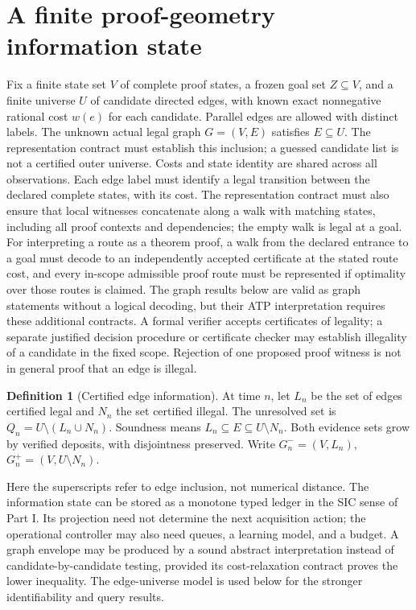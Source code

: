 \documentclass[11pt]{article}
\theoremstyle{definition}\newtheorem{definition}[theorem]{Definition}\newtheorem{example}[theorem]{Example}\newtheorem{conjecture}[theorem]{Conjecture}
\begin{document}
\section{A finite proof-geometry information state}
Fix a finite state set $V$ of complete proof states, a frozen goal set $Z\subseteq V$, and a finite universe $U$ of candidate directed edges, with known exact nonnegative rational cost $w(e)$ for each candidate. Parallel edges are allowed with distinct labels. The unknown actual legal graph $G=(V,E)$ satisfies $E\subseteq U$. The representation contract must establish this inclusion; a guessed candidate list is not a certified outer universe. Costs and state identity are shared across all observations. Each edge label must identify a legal transition between the declared complete states, with its cost. The representation contract must also ensure that local witnesses concatenate along a walk with matching states, including all proof contexts and dependencies; the empty walk is legal at a goal. For interpreting a route as a theorem proof, a walk from the declared entrance to a goal must decode to an independently accepted certificate at the stated route cost, and every in-scope admissible proof route must be represented if optimality over those routes is claimed. The graph results below are valid as graph statements without a logical decoding, but their ATP interpretation requires these additional contracts. A formal verifier accepts certificates of legality; a separate justified decision procedure or certificate checker may establish illegality of a candidate in the fixed scope. Rejection of one proposed proof witness is not in general proof that an edge is illegal.
\begin{definition}[Certified edge information]
At time $n$, let $L_n$ be the set of edges certified legal and $N_n$ the set certified illegal. The unresolved set is $Q_n=U\setminus(L_n\cup N_n)$. Soundness means $L_n\subseteq E\subseteq U\setminus N_n$. Both evidence sets grow by verified deposits, with disjointness preserved. Write $G_n^-=(V,L_n)$, $G_n^+=(V,U\setminus N_n)$.
\end{definition}
Here the superscripts refer to edge inclusion, not numerical distance. The information state can be stored as a monotone typed ledger in the SIC sense of Part I. Its projection need not determine the next acquisition action; the operational controller may also need queues, a learning model, and a budget. A graph envelope may be produced by a sound abstract interpretation instead of candidate-by-candidate testing, provided its cost-relaxation contract proves the lower inequality. The edge-universe model is used below for the stronger identifiability and query results.
\end{document}
